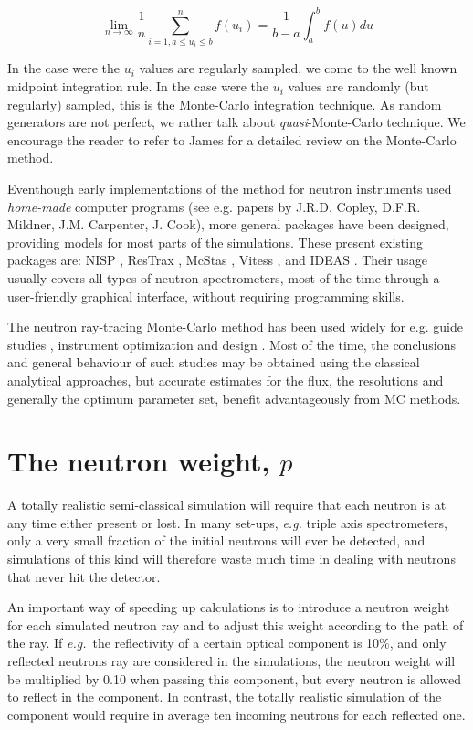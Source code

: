 \begin{equation}
\lim_{n \rightarrow \infty} \frac{1}{n} \sum_{i=1, a \leq u_i \leq b}^n f(u_i) = \frac{1}{b-a}\int_a^b f(u) du
\end{equation}

In the case were the $u_i$ values are regularly sampled, we come to the well known midpoint integration rule. In the case were the $u_i$ values are randomly (but regularly) sampled, this is the Monte-Carlo integration technique. As random generators are not perfect, we rather talk about \emph{quasi}-Monte-Carlo technique. We encourage the reader to refer to James \cite{James80} for a detailed review on the Monte-Carlo method.

Eventhough early implementations of the method for neutron instruments used \emph{home-made} computer programs  (see e.g. papers by J.R.D. Copley, D.F.R. Mildner, J.M. Carpenter, J. Cook), more general packages have been designed, providing models for most parts of the simulations.
These present existing packages are: NISP \cite{NISP}, ResTrax \cite{Restrax}, McStas \cite{nn_10_20,mcstas_pb,mcstas_webpage}, Vitess \cite{Vitess,vitess_webpage}, and IDEAS \cite{IDEAS}.
Their usage usually covers all types of neutron spectrometers, most of the time through a user-friendly graphical interface, without requiring programming skills.

The neutron ray-tracing Monte-Carlo method has been used widely for e.g. guide studies \cite{Copley93,Farhi02,Schanzer04}, instrument optimization and design \cite{Zsigmond04,Lieutenant05}. Most of the time, the conclusions and general behaviour of such studies may be obtained using the classical analytical approaches, but accurate estimates for the flux, the resolutions and generally the optimum parameter set, benefit advantageously from MC methods.

\section{The neutron weight, $p$}
\label{s:probweight}
A totally realistic semi-classical simulation will require that
each neutron is at any time either present or lost.
In many set-ups, {\em e.g.} triple axis spectrometers, only a very
small fraction of the initial neutrons will ever be detected, and
simulations of this kind will therefore waste much time in dealing
with neutrons that never hit the detector.

An important way of speeding up calculations is to introduce
a neutron weight for each simulated neutron ray and to
adjust this weight according to the path of the ray.
If {\em e.g.}\ the reflectivity of a certain
optical component is 10\%, and only reflected neutrons ray are
considered in the simulations, the neutron
weight will be multiplied by 0.10 when passing this component,
but every neutron is allowed to reflect in the component.
In contrast, the totally realistic simulation of the component
would require in average ten incoming neutrons for each reflected one.

